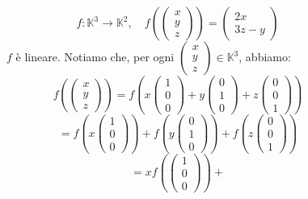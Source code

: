 \documentclass[a4paper]{article}
\theoremstyle{break}
\theoremstyle{break}
\theoremstyle{break}
\theoremstyle{break}
\begin{document}
\begin{figure}[H]
  \begin{example}
    \[
    f: \mathbb{K}^3 \to \mathbb{K}^2, \quad f\left( \begin{pmatrix} 
        x\\
        y\\
        z
    \end{pmatrix}  \right) =
    \begin{pmatrix} 
      2x \\
      3z - y
    \end{pmatrix} 
    \] 
    \( f \) è lineare. Notiamo che, per ogni \( \begin{pmatrix} x\\y\\z \end{pmatrix} 
    \in \mathbb{K}^3\), abbiamo:
    \[
    f\left( \begin{pmatrix} x\\y\\z \end{pmatrix}  \right) =
    f\left( x \begin{pmatrix} 1\\0\\0 \end{pmatrix} +
    y \begin{pmatrix} 0\\1\\0 \end{pmatrix} +
  z \begin{pmatrix} 0\\0\\1 \end{pmatrix} \right) 
    \] 
    \[
    = f\left(x \begin{pmatrix} 1\\0\\0 \end{pmatrix} \right) +
    f\left( y \begin{pmatrix} 0\\1\\0 \end{pmatrix}  \right) +
    f\left( z \begin{pmatrix} 0\\0\\1 \end{pmatrix}  \right) 
    \] 
    \[
    = xf\left( \begin{pmatrix} 1\\0\\0 \end{pmatrix}  \right) +
\]
\end{example}
\end{figure}
\end{document}
